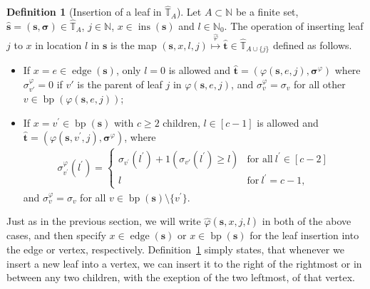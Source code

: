 \documentclass[a4paper, final]{amsart}
\theoremstyle{plain}
\theoremstyle{definition}
\newtheorem{defi}[thm]{Definition}
\newcommand{\tree}[1][t]{\boldsymbol{#1}}
\newcommand{\that}[1][t]{\hat{\boldsymbol{#1}}} %
\newcommand{\treesigma}[1][\sigma]{\boldsymbol{#1}}
\newcommand{\Thatspace}[1][\T]{\widehat{\boldsymbol{#1}}} %
\newcommand{\T}{\mathbb{T}}
\DeclareMathOperator{\edge}{edge}
\DeclareMathOperator{\insertable}{ins}
\DeclareMathOperator{\branchpoints}{bp}
\newcommand{\insertablef}[1][\tree]{\insertable({\tree[#1]})}
\newcommand{\N}{\mathbb{N}}
\begin{document}
%
\begin{defi}[Insertion of a leaf in $\Thatspace_A$]\label{def:insertionplanar}
  Let $A \subset \N$ be a finite set, $\that[s] = \left( \tree[s], \treesigma \right) \in \Thatspace_A$, $j \in \N$, $x \in \insertablef[s]$ and $l \in \N_0$.
  The operation of inserting leaf $j$ to $x$ in location $l$ in $\tree[s]$ is the map $\left( \tree[s], x, l, j \right) \overset{\hat{\varphi}}{\mapsto} \that \in \Thatspace_{A \cup \{j\}}$ defined as follows. 
    \begin{itemize}
      \item If $x = e \in \edge ( \tree[s] )$, only $l = 0$ is allowed and $\that = \left( \varphi \left( \tree[s], e, j \right), \treesigma^\varphi \right)$ where $\sigma_{v'}^\varphi = 0$ if $v'$ is the parent of leaf $j$ in $\varphi ( \tree[s], e, j )$, and $\sigma_v^\varphi = \sigma_v$ for all other $v \in \branchpoints( \varphi ( \tree[s], e, j ) )$;
      \item If $x = v^\prime \in \branchpoints( \tree[s] )$ with $c \geq 2$ children, $l \in [c-1]$ is allowed and $\that = \left( \varphi \left( \tree[s], v^\prime, j \right), \treesigma^\varphi \right)$, where 
    \begin{align*}
      \sigma_{v^\prime}^\varphi ( l^\prime )
      =
      \begin{cases}
        \sigma_{v^\prime}(l^\prime) + 1 \left( \sigma_{v'}(l^\prime) \geq l \right) & \text{for all}\ l^\prime \in [c-2] \\
        l & \text{for}\ l^\prime = c-1,
      \end{cases}
    \end{align*}
    and $\sigma_v^\varphi = \sigma_v$ for all $v \in \branchpoints( \tree[s] ) \setminus \{v^\prime\}$.
    \end{itemize}
  \end{defi}
  Just as in the previous section, we will write $\hat{\varphi} ( \that[s], x, j, l )$ in both of the above cases, and then specify $x \in \edge (\tree[s])$ or $x \in \branchpoints(\tree[s])$ for the leaf insertion into the edge or vertex, respectively.
%
  Definition~\ref{def:insertionplanar} simply states, that whenever we insert a new leaf into a vertex, we can insert it to the right of the rightmost or in between any two children, with the exeption of the two leftmost, of that vertex.
\end{document}
